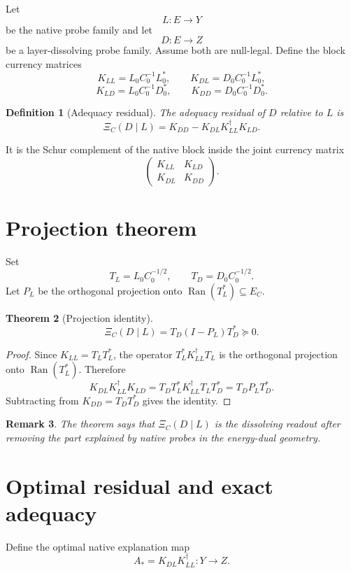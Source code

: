 \documentclass[11pt]{article}
\newtheorem{theorem}{Theorem}[section]
\newtheorem{definition}[theorem]{Definition}
\newtheorem{remark}[theorem]{Remark}
\newcommand{\Ran}{\operatorname{Ran}}
\begin{document}
Let
\[
L:E\to Y
\]
be the native probe family and let
\[
D:E\to Z
\]
be a layer-dissolving probe family.  Assume both are null-legal.  Define the block currency matrices
\[
K_{LL}=L_0C_0^{-1}L_0^*,
\qquad
K_{DL}=D_0C_0^{-1}L_0^*,
\]
\[
K_{LD}=L_0C_0^{-1}D_0^*,
\qquad
K_{DD}=D_0C_0^{-1}D_0^*.
\]

\begin{definition}[Adequacy residual]
The adequacy residual of $D$ relative to $L$ is
\[
\boxed{\Xi_C(D\mid L)=K_{DD}-K_{DL}K_{LL}^\dagger K_{LD}.}
\]
\end{definition}

It is the Schur complement of the native block inside the joint currency matrix
\[
\begin{pmatrix}
K_{LL}&K_{LD}\\
K_{DL}&K_{DD}
\end{pmatrix}.
\]

\section{Projection theorem}

Set
\[
T_L=L_0C_0^{-1/2},
\qquad
T_D=D_0C_0^{-1/2}.
\]
Let $P_L$ be the orthogonal projection onto $\Ran(T_L^*)\subseteq E_C$.

\begin{theorem}[Projection identity]
\[
\boxed{\Xi_C(D\mid L)=T_D(I-P_L)T_D^*\succeq 0.}
\]
\end{theorem}

\begin{proof}
Since $K_{LL}=T_LT_L^*$, the operator $T_L^*K_{LL}^\dagger T_L$ is the orthogonal projection onto $\Ran(T_L^*)$.  Therefore
\[
K_{DL}K_{LL}^\dagger K_{LD}=T_DT_L^*K_{LL}^\dagger T_LT_D^*=T_DP_LT_D^*.
\]
Subtracting from $K_{DD}=T_DT_D^*$ gives the identity.
\end{proof}

\begin{remark}
The theorem says that $\Xi_C(D\mid L)$ is the dissolving readout after removing the part explained by native probes in the energy-dual geometry.
\end{remark}

\section{Optimal residual and exact adequacy}

Define the optimal native explanation map
\[
A_*=K_{DL}K_{LL}^\dagger:Y\to Z.
\]
\end{document}

